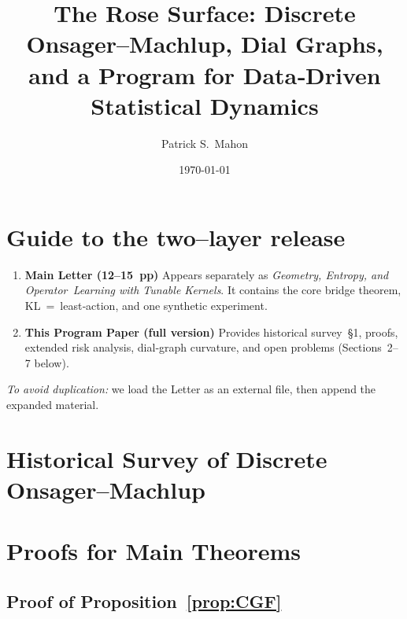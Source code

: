 \documentclass[11pt]{article}
\title{The Rose Surface: Discrete Onsager--Machlup, Dial Graphs, and a Program for Data‑Driven Statistical Dynamics}
\author{Patrick S.\ Mahon}
\date{\today}
\begin{document}
\maketitle
\tableofcontents

\section*{Guide to the two–layer release}
\begin{enumerate}[label=\textbf{\Alph*)},leftmargin=*]
\item \textbf{Main Letter (12–15 pp)}  
      Appears separately as \emph{Geometry, Entropy, and Operator Learning
      with Tunable Kernels}.  It contains the core bridge
      theorem, KL = least‑action, and one synthetic experiment.

\item \textbf{This Program Paper (full version)}  
      Provides historical survey §1, proofs, extended risk analysis,
      dial‑graph curvature, and open problems (Sections 2–7 below).
\end{enumerate}
\vspace{1ex}
\noindent
\emph{To avoid duplication:} we load the Letter as an external file,
then append the expanded material.


\section{Historical Survey of Discrete Onsager–Machlup}

\section{Proofs for Main Theorems}
\subsection{Proof of Proposition~\ref{prop:CGF}}
\end{document}
